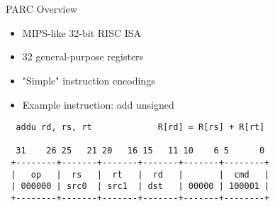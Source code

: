 
\section[{\it Hands-On} GCD Instr]{}


\begin{frame}[fragile]{PARC Overview}

\begin{itemize}
  \item MIPS-like 32-bit RISC ISA
  \item 32 general-purpose registers
  \item "Simple" instruction encodings
  \item Example instruction: add unsigned
\end{itemize}

\begin{verbatim}
  addu rd, rs, rt             R[rd] = R[rs] + R[rt]

  31    26 25   21 20   16 15   11 10    6 5      0
 +--------+-------+-------+-------+-------+--------+
 |   op   |  rs   |  rt   |  rd   |       |  cmd   |
 | 000000 | src0  | src1  | dst   | 00000 | 100001 |
 +--------+-------+-------+-------+-------+--------+

\end{verbatim}

\end{frame}


